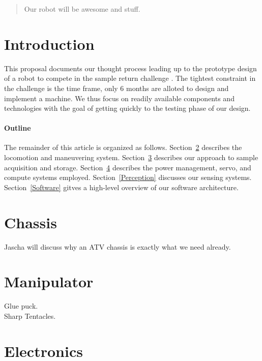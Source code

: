 \documentclass[12pt]{article}
\begin{document}
\maketitle

\begin{abstract}
Our robot will be awesome and stuff.
\end{abstract}

\section{Introduction}
This proposal documents our thought process leading up to the prototype design of a robot to compete in the sample return challenge \cite{rules}. The tightest constraint in the challenge is the time frame, only 6 months are alloted to design and implement a machine. We thus focus on readily available components and technologies with the goal of getting quickly to the testing phase of our design.

\paragraph{Outline}
The remainder of this article is organized as follows.
Section~\ref{Chassis} describes the locomotion and maneuvering system. Section~\ref{Manipulator} describes our approach to sample acquisition and storage. Section~\ref{Electronics} describes the power management, servo, and compute systems employed. Section~\ref{Perception} discusses our sensing systems. Section~\ref{Software} gitves a high-level overview of our software architecture.

\section{Chassis}\label{Chassis}
Jascha will discuss why an ATV chassis is exactly what we need already.

\section{Manipulator}\label{Manipulator}

Glue puck.\\

Sharp Tentacles.\\

\section{Electronics}\label{Electronics}
\end{document}
